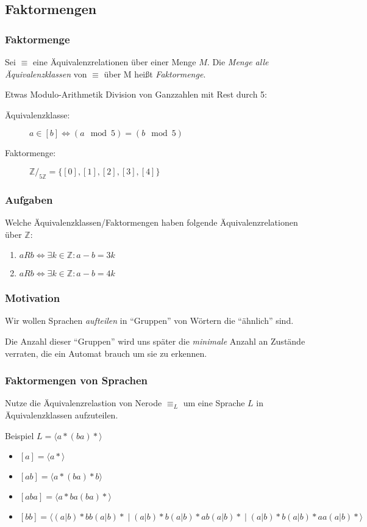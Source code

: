 \subsection{Faktormengen}
\begin{frame}
  \frametitle{Faktormenge}
  \begin{definition}
    Sei $\equiv$ eine Äquivalenzrelationen über einer Menge $M$. Die \emph{Menge alle Äquivalenzklassen} von $\equiv$ über M heißt \emph{Faktormenge}.
  \end{definition}
  \begin{exampleblock}{Etwas Modulo-Arithmetik}
    Division von Ganzzahlen mit Rest durch 5:
    \begin{description}
      \item[Äquivalenzklasse:] $a \in [b] \Leftrightarrow (a \mod 5) = (b \mod 5)$
      \item[Faktormenge:] $\mathbb{Z}/_{5\mathbb{Z}} = \{[0], [1], [2], [3], [4]\}$
    \end{description}
  \end{exampleblock}
\end{frame}
\begin{frame}
  \frametitle{Aufgaben}
    Welche Äquivalenzklassen/Faktormengen haben folgende Äquivalenzrelationen über $\mathbb{Z}$:
    \begin{enumerate}
      \item $a R b \Leftrightarrow \exists k \in \mathbb{Z}: a - b = 3k$\\
      \item $a R b \Leftrightarrow \exists k \in \mathbb{Z}: a - b = 4k$\\
    \end{enumerate}
\end{frame}
\begin{frame}
  \frametitle{Motivation}
  Wir wollen Sprachen \emph{aufteilen} in ``Gruppen'' von Wörtern die ``ähnlich'' sind.

  Die Anzahl dieser ``Gruppen'' wird uns später die \emph{minimale} Anzahl an Zustände verraten, die ein Automat brauch um sie zu erkennen.
\end{frame}
\begin{frame}
  \frametitle{Faktormengen von Sprachen}
  Nutze die Äquivalenzrelastion von Nerode $\equiv_L$ um eine Sprache $L$ in Äquivalenzklassen aufzuteilen.
  \begin{exampleblock}{Beispiel}
    $L = \langle {a*}{(ba)*} \rangle$
    \begin{itemize}
      \item $[a] = \langle {a*} \rangle$
      \item $[ab] = \langle {a*}{(ba)*}b \rangle$
      \item $[aba] = \langle {a*}ba{(ba)*}\rangle$
      \item $[bb] = \langle {(a|b)*}bb{(a|b)*} \; | \; {(a|b)*}{b(a|b)*}{ab(a|b)*} \; | \; {(a|b)*}{b(a|b)*}aa{(a|b)*} \rangle$
    \end{itemize}
  \end{exampleblock}
\end{frame}

